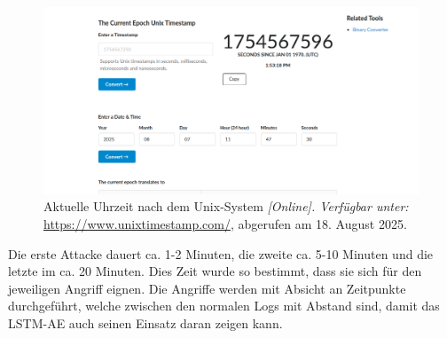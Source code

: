 \documentclass[a4paper,12pt]{article}
\begin{document}
	\begin{figure}[H]
		\centering
		\includegraphics[width=0.9\linewidth]{Bilder/screenshot019}
		\caption{Aktuelle Uhrzeit nach dem Unix-System \textit{[Online]. Verfügbar unter:} \url{https://www.unixtimestamp.com/}, abgerufen am 18. August 2025.}
		\label{fig:screenshot019}
	\end{figure}
	
	Die erste Attacke dauert ca. 1-2 Minuten, die zweite ca. 5-10 Minuten und die letzte im ca. 20 Minuten. Dies Zeit wurde so bestimmt, dass sie sich für den jeweiligen Angriff eignen. Die Angriffe werden mit Absicht an Zeitpunkte durchgeführt, welche zwischen den normalen Logs mit Abstand sind, damit das LSTM-AE auch seinen Einsatz daran zeigen kann. 
	
\end{document}
